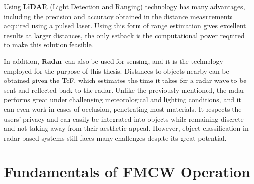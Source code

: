 Using \textbf{LiDAR} (Light Detection and Ranging) technology has many advantages, including the precision and accuracy obtained in the distance measurements acquired using a pulsed laser. Using this form of range estimation gives excellent results at larger distances, the only setback is the computational power required to make this solution feasible.

In addition, \textbf{Radar} can also be used for sensing, and it is the technology employed for the purpose of this thesis. Distances to objects nearby can be obtained given the \gls{ToF}, which estimates the time it takes for a radar wave to be sent and reflected back to the radar. Unlike the previously mentioned, the radar performs great under challenging meteorological and lighting conditions, and it can even work in cases of occlusion, penetrating most  materials. It respects the users' privacy and can easily be integrated into objects while remaining discrete and not taking away from their aesthetic appeal. However, object classification in radar-based systems still faces many challenges despite its great potential.

\section{Fundamentals of FMCW Operation}
\label{sec:fundamentals_fmcw_operation}
